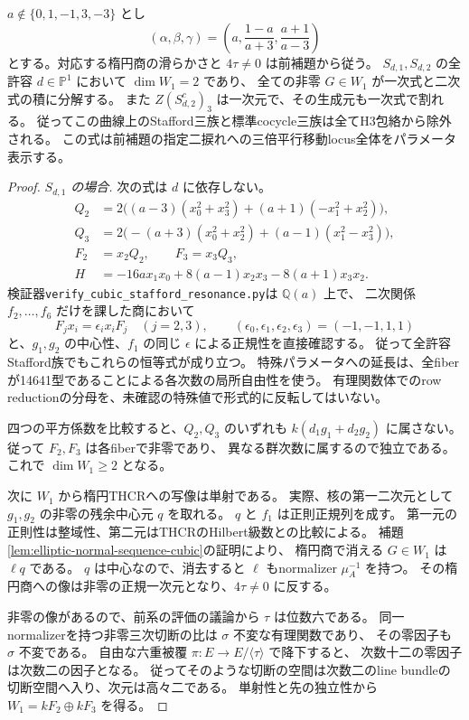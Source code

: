 \begin{theorem}[非零候補が現れるStafford曲線も全排除される]
\label{thm:stafford-resonant-pencil-exclusion}
$a\notin\{0,1,-1,3,-3\}$ とし
\[
 (\alpha,\beta,\gamma)
 =\left(a,\frac{1-a}{a+3},\frac{a+1}{a-3}\right)
\]
とする。対応する楕円商の滑らかさと $4\tau\ne0$ は前補題から従う。
$S_{d,1},S_{d,2}$ の全許容 $d\in\mathbb P^1$ において $\dim W_1=2$ であり、
全ての非零 $G\in W_1$ が一次式と二次式の積に分解する。
また $Z(S_{d,2}^c)_3$ は一次元で、その生成元も一次式で割れる。
従ってこの曲線上のStafford三族と標準cocycle三族は全てH3包絡から除外される。
この式は前補題の指定二捩れへの三倍平行移動locus全体をパラメータ表示する。
\end{theorem}
\begin{proof}
\emph{$S_{d,1}$ の場合.}
次の式は $d$ に依存しない。
\[
\begin{split}
 Q_2&=2\bigl((a-3)(x_0^2+x_3^2)+(a+1)(-x_1^2+x_2^2)\bigr),\\
 Q_3&=2\bigl(-(a+3)(x_0^2+x_2^2)+(a-1)(x_1^2-x_3^2)\bigr),\\
 F_2&=x_2Q_2,\qquad F_3=x_3Q_3,\\
 H&=-16a x_1x_0+8(a-1)x_2x_3-8(a+1)x_3x_2.
\end{split}
\]
検証器\texttt{verify\_cubic\_stafford\_resonance.py}は $\mathbb Q(a)$ 上で、
二次関係 $f_2,\ldots,f_6$ だけを課した商において
\[
 F_jx_i=\epsilon_i x_iF_j\quad
 (j=2,3),\qquad (\epsilon_0,\epsilon_1,\epsilon_2,\epsilon_3)=(-1,-1,1,1)
\]
と、$g_1,g_2$ の中心性、$f_1$ の同じ $\epsilon$ による正規性を直接確認する。
従って全許容Stafford族でもこれらの恒等式が成り立つ。
特殊パラメータへの延長は、全fiberが14641型であることによる各次数の局所自由性を使う。
有理関数体でのrow reductionの分母を、未確認の特殊値で形式的に反転してはいない。

四つの平方係数を比較すると、$Q_2,Q_3$ のいずれも
$k(d_1g_1+d_2g_2)$ に属さない。従って $F_2,F_3$ は各fiberで非零であり、
異なる群次数に属するので独立である。これで $\dim W_1\ge2$ となる。

次に $W_1$ から楕円THCRへの写像は単射である。
実際、核の第一二次元として $g_1,g_2$ の非零の残余中心元 $q$ を取れる。
$q$ と $f_1$ は正則正規列を成す。
第一元の正則性は整域性、第二元はTHCRのHilbert級数との比較による。
補題\ref{lem:elliptic-normal-sequence-cubic}の証明により、
楕円商で消える $G\in W_1$ は $\ell q$ である。
$q$ は中心なので、消去すると $\ell$ もnormalizer $\mu_A^{-1}$ を持つ。
その楕円商への像は非零の正規一次元となり、$4\tau\ne0$ に反する。

非零の像があるので、前系の評価の議論から $\tau$ は位数六である。
同一normalizerを持つ非零三次切断の比は $\sigma$ 不変な有理関数であり、
その零因子も $\sigma$ 不変である。
自由な六重被覆 $\pi:E\to E/\langle\tau\rangle$ で降下すると、
次数十二の零因子は次数二の因子となる。
従ってそのような切断の空間は次数二のline bundleの切断空間へ入り、次元は高々二である。
単射性と先の独立性から $W_1=kF_2\oplus kF_3$ を得る。


\end{proof}
